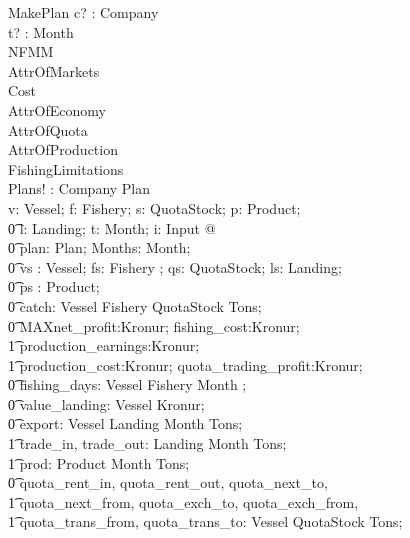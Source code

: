 \documentclass[11pt]{article}
\begin{document}
\begin{schema}{MakePlan}
        c? : Company \\
        t? : Month  \\
        \Xi NFMM \\
        \Xi AttrOfMarkets  \\
        \Xi Cost \\
        \Xi AttrOfEconomy \\
        \Xi AttrOfQuota \\
        \Xi AttrOfProduction \\
        \Xi FishingLimitations \\
        Plans! : Company \fun  Plan  \\
\zbreak
\where
        \forall v: Vessel; f: Fishery; s: QuotaStock; p: Product; \\
\t0     l: Landing; t: Month; i: Input @ \\
\t0     \exists  plan: Plan; Months: \power Month;   \\
\t0     vs : \power Vessel; fs: \power Fishery ; qs: \power QuotaStock; ls: \power Landing; \\
\t0     ps : \power Product; \\ 
\t0     catch: Vessel  \cross Fishery \cross QuotaStock \pfun Tons;  \\
\t0     MAXnet\_profit:Kronur; fishing\_cost:Kronur; \\
        \t1  production\_earnings:Kronur; \\
        \t1  production\_cost:Kronur; quota\_trading\_profit:Kronur;  \\
\t0     fishing\_days: Vessel \cross Fishery \cross Month \pfun \nat; \\
\t0     value\_landing: Vessel \fun Kronur;  \\
\t0     export: Vessel \cross Landing \cross Month \pfun Tons; \\
        \t1 trade\_in, trade\_out: Landing \cross Month \pfun Tons; \\
        \t1 prod: Product \cross Month \fun Tons;  \\
\t0     quota\_rent\_in, quota\_rent\_out, quota\_next\_to, \\
        \t1 quota\_next\_from, quota\_exch\_to, quota\_exch\_from,\\
        \t1 quota\_trans\_from, quota\_trans\_to: Vessel \cross QuotaStock \pfun Tons;  \\

\end{schema}
\end{document}
